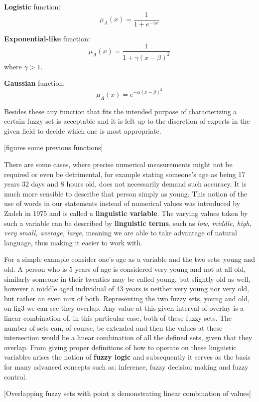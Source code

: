 \textbf{Logistic} function:
\[
	\mu_{A}(x) = \frac{1}{1 + e^{-\gamma x}}
\]

\textbf{Exponential-like} function:
\[
	\mu_{A}(x) = \frac{1}{1 + \gamma(x - \beta)^2}
\]
where $\gamma > 1$.

\textbf{Gaussian} function:
\[
	\mu_{A}(x) = e^{-\alpha (x - \beta)^2}
\]

Besides these any function that fits the intended purpose of characterizing a certain fuzzy set is acceptable and it is left up to the discretion of experts in the given field to decide which one is most appropriate.

[figures some previous functions]

There are some cases, where precise numerical measurements might not be required or even be detrimental, for example stating someone's age as being 17 years 32 days and 8 hours old, does not necessarily demand such accuracy. It is much more sensible to describe that person simply as young. This notion of the use of words in our statements instead of numerical values was introduced by Zadeh in 1975 and is called a \textbf{linguistic variable}. The varying values taken by such a variable can be described by \textbf{linguistic terms}, such as \textit{low, middle, high, very small, average, large}, meaning we are able to take advantage of natural language, thus making it easier to work with.

For a simple example consider one's age as a variable and the two sets: young and old. A person who is 5 years of age is considered very young and not at all old, similarly someone in their twenties may be called young, but slightly old as well, however a middle aged individual of 43 years is neither very young nor very old, but rather an even mix of both. Representing the two fuzzy sets, young and old, on fig3 we can see they overlap. Any value at this given interval of overlay is a linear combination of, in this particular case, both of these fuzzy sets. The number of sets can, of course, be extended and then the values at these intersection would be a linear combination of all the defined sets, given that they overlap. From giving proper definitions of how to operate on these linguistic variables arises the notion of \textbf{fuzzy logic} and subsequently it serves as the basis for many advanced concepts such as: inference, fuzzy decision making and fuzzy control.

[Overlapping fuzzy sets with point x demonstrating linear combination of values]
\begin{figure}[!h]
\centering
\end{figure}

